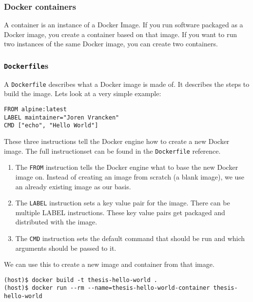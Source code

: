 \subsubsection{Docker containers}
A container is an instance of a Docker Image. If you run software packaged as a Docker image, you create a container based on that image. If you want to run two instances of the same Docker image, you can create two containers.

\subsubsection{\lstinline{Dockerfile}s}
A \lstinline{Dockerfile} describes what a Docker image is made of. It describes the steps to build the image. Lets look at a very simple example:

\begin{lstlisting}[caption={Very Basic \lstinline{Dockerfile}},label={dockerfile:simple},captionpos=b]
FROM alpine:latest
LABEL maintainer="Joren Vrancken"
CMD ["echo", "Hello World"]
\end{lstlisting}

These three instructions tell the Docker engine how to create a new Docker image.
The full instructionset can be found in the \lstinline{Dockerfile} reference\cite{Dockerfile-Reference}.

\begin{enumerate}
    \item The \lstinline{FROM} instruction tells the Docker engine what to base the new Docker image on. Instead of creating an image from scratch (a blank image), we use an already existing image as our basis.

    \item The \lstinline{LABEL} instruction sets a key value pair for the image. There can be multiple LABEL instructions. These key value pairs get packaged and distributed with the image.

    \item The \lstinline{CMD} instruction sets the default command that should be run and which arguments should be passed to it.
\end{enumerate}

We can use this to create a new image and container from that image.
\begin{lstlisting}[caption={Creating a Docker container from a \lstinline{Dockerfile}},label={docker:container},captionpos=b]
(host)$ docker build -t thesis-hello-world .
(host)$ docker run --rm --name=thesis-hello-world-container thesis-hello-world
\end{lstlisting}

